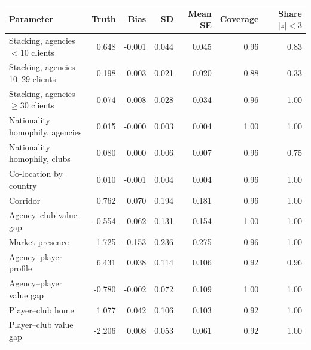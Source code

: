 \begin{tabular}{lrrrrrr}\hline
Parameter & Truth & Bias & SD & Mean SE & Coverage & Share $|z|<3$ \\ \hline
Stacking, agencies $<10$ clients & 0.648 & -0.001 & 0.044 & 0.045 & 0.96 & 0.83 \\
Stacking, agencies 10--29 clients & 0.198 & -0.003 & 0.021 & 0.020 & 0.88 & 0.33 \\
Stacking, agencies $\ge30$ clients & 0.074 & -0.008 & 0.028 & 0.034 & 0.96 & 1.00 \\
Nationality homophily, agencies & 0.015 & -0.000 & 0.003 & 0.004 & 1.00 & 1.00 \\
Nationality homophily, clubs & 0.080 & 0.000 & 0.006 & 0.007 & 0.96 & 0.75 \\
Co-location by country & 0.010 & -0.001 & 0.004 & 0.004 & 0.96 & 1.00 \\
Corridor & 0.762 & 0.070 & 0.194 & 0.181 & 0.96 & 1.00 \\
Agency--club value gap & -0.554 & 0.062 & 0.131 & 0.154 & 1.00 & 1.00 \\
Market presence & 1.725 & -0.153 & 0.236 & 0.275 & 0.96 & 1.00 \\
Agency--player profile & 6.431 & 0.038 & 0.114 & 0.106 & 0.92 & 0.96 \\
Agency--player value gap & -0.780 & -0.002 & 0.072 & 0.109 & 1.00 & 1.00 \\
Player--club home & 1.077 & 0.042 & 0.106 & 0.103 & 0.92 & 1.00 \\
Player--club value gap & -2.206 & 0.008 & 0.053 & 0.061 & 0.92 & 1.00 \\
\hline\end{tabular}
